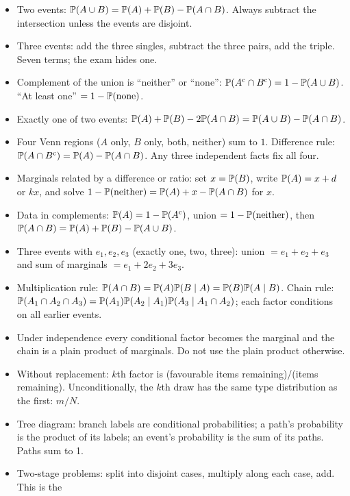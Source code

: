 \begin{itemize}[leftmargin=2em]
  \item Two events: $\mathbb{P}(A \cup B) = \mathbb{P}(A) + \mathbb{P}(B) - \mathbb{P}(A \cap B)$. Always subtract
  the intersection unless the events are disjoint.
  \item Three events: add the three singles, subtract the three pairs, add the triple. Seven terms;
  the exam hides one.
  \item Complement of the union is ``neither'' or ``none'':
  $\mathbb{P}(A^{\mathrm{c}} \cap B^{\mathrm{c}}) = 1 - \mathbb{P}(A \cup B)$. ``At least one'' $= 1 - \mathbb{P}(\text{none})$.
  \item Exactly one of two events: $\mathbb{P}(A) + \mathbb{P}(B) - 2\mathbb{P}(A \cap B) = \mathbb{P}(A \cup B) - \mathbb{P}(A \cap B)$.
  \item Four Venn regions ($A$ only, $B$ only, both, neither) sum to $1$. Difference rule:
  $\mathbb{P}(A \cap B^{\mathrm{c}}) = \mathbb{P}(A) - \mathbb{P}(A \cap B)$. Any three independent facts fix all four.
  \item Marginals related by a difference or ratio: set $x = \mathbb{P}(B)$, write $\mathbb{P}(A) = x + d$ or
  $kx$, and solve $1 - \mathbb{P}(\text{neither}) = \mathbb{P}(A) + x - \mathbb{P}(A \cap B)$ for $x$.
  \item Data in complements: $\mathbb{P}(A) = 1 - \mathbb{P}(A^{\mathrm{c}})$, union $= 1 - \mathbb{P}(\text{neither})$,
  then $\mathbb{P}(A \cap B) = \mathbb{P}(A) + \mathbb{P}(B) - \mathbb{P}(A \cup B)$.
  \item Three events with $e_1, e_2, e_3$ (exactly one, two, three): union $= e_1 + e_2 + e_3$ and
  sum of marginals $= e_1 + 2e_2 + 3e_3$.
  \item Multiplication rule: $\mathbb{P}(A \cap B) = \mathbb{P}(A)\mathbb{P}(B \mid A) = \mathbb{P}(B)\mathbb{P}(A \mid B)$.
  Chain rule: $\mathbb{P}(A_1 \cap A_2 \cap A_3) = \mathbb{P}(A_1)\mathbb{P}(A_2 \mid A_1)\mathbb{P}(A_3 \mid A_1 \cap A_2)$;
  each factor conditions on all earlier events.
  \item Under independence every conditional factor becomes the marginal and the chain is a plain
  product of marginals. Do not use the plain product otherwise.
  \item Without replacement: $k$th factor is (favourable items remaining)/(items remaining).
  Unconditionally, the $k$th draw has the same type distribution as the first: $m/N$.
  \item Tree diagram: branch labels are conditional probabilities; a path's probability is the
  product of its labels; an event's probability is the sum of its paths. Paths sum to 1.
  \item Two-stage problems: split into disjoint cases, multiply along each case, add. This is the

\end{itemize}
